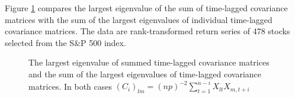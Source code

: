 \documentclass[11pt,reqno]{amsart}
\newcommand{\1}{\mathds{1}}
\newcommand{\0}{\boldsymbol{0}}
\newcommand{\4}{\mathchoice{\mskip1.5mu}{\mskip1.5mu}{}{}}
\newcommand{\5}{\mathchoice{\mskip-1.5mu}{\mskip-1.5mu}{}{}}
\newcommand{\2}{\penalty250\mskip\thickmuskip\mskip-\thinmuskip} %
\begin{document}
Figure \ref{fig:LamYao} compares the largest eigenvalue of the sum of
time-lagged covariance matrices with the sum of the largest
eigenvalues of individual time-lagged covariance matrices. The data
are rank-transformed return series of 478 stocks selected from the S\&P
500 index.
\begin{figure}[htb!]
  \centering
  \label{fig:LamYao}
  \caption{The largest eigenvalue of summed time-lagged covariance
    matrices and the sum of the largest eigenvalues of time-lagged
    covariance matrices. In both cases $(C_i)_{lm} =
    (np)^{-2}\sum_{t=1}^{n-i} X_{lt} X_{m,t+i}$}
\end{figure}
\end{document}
